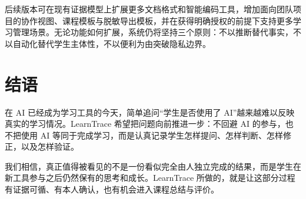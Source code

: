 \documentclass[UTF8,a4paper,12pt]{ctexart}
\begin{document}
后续版本可在现有证据模型上扩展更多文档格式和智能编码工具，增加面向团队项目的协作视图、课程模板与脱敏导出模板，并在获得明确授权的前提下支持更多学习管理场景。无论功能如何扩展，系统仍将坚持三个原则：不以推断替代事实，不以自动化替代学生主体性，不以便利为由突破隐私边界。

\section*{结语}

在 AI 已经成为学习工具的今天，简单追问“学生是否使用了 AI”越来越难以反映真实的学习情况。LearnTrace 希望把问题向前推进一步：不回避 AI 的参与，也不把使用 AI 等同于完成学习，而是认真记录学生怎样提问、怎样判断、怎样修正，以及怎样验证。

我们相信，真正值得被看见的不是一份看似完全由人独立完成的结果，而是学生在新工具参与之后仍然保有的思考和成长。LearnTrace 所做的，就是让这部分过程有证据可循、有本人确认，也有机会进入课程总结与评价。
\end{document}

